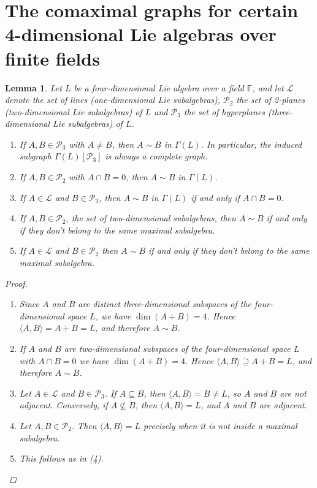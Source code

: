 \documentclass[11pt]{amsart}
\theoremstyle{plain}
\newtheorem{lemma}[theorem]{Lemma}
\begin{document}
\section{The comaximal graphs for certain 4-dimensional Lie algebras over finite fields}

\begin{lemma}\label{g-adjacency}
Let $L$ be a four-dimensional Lie algebra over a field $\mathbb{F}$,  and let $\mathcal{L}$ denote the set of lines (one-dimensional Lie subalgebras), $\mathcal{P_2}$ the set of 2-planes (two-dimensional Lie subalgebras) of $L$ and $\mathcal{P_3}$ the set of hyperplanes (three-dimensional Lie subalgebras) of $L$.
\begin{enumerate}[(1)]
\item If $A, B \in \mathcal{P}_3$ with $A \neq B$, then $A \sim B$ in $\Gamma(L)$. In particular, the induced subgraph 
$\Gamma(L)[\mathcal{P}_3]$ is always a complete graph.
\item If $A, B \in \mathcal{P}_2$ with $A\cap B=0$, then $A \sim B$ in $\Gamma(L)$.
\item If $A \in \mathcal{L}$ and $B \in \mathcal{P}_3$, then $A \sim B$ in $\Gamma(L)$ if and only if $A \cap B=0$.
\item If $A, B\in \mathcal{P}_2$, the set of two-dimensional subalgebras, then $A\sim B$ if and only if they don't belong to the same maximal subalgebra.
\item If $A\in \mathcal{L}$ and $B\in \mathcal{P}_2$ then $A\sim B$ if and only if they don't belong to the same maximal subalgebra.
\end{enumerate}

\begin{proof}
\begin{enumerate}[(1)]
\item Since $A$ and $B$ are distinct three-dimensional subspaces of the four-dimensional space $L$, we have $\dim(A + B) = 4$. Hence $\langle A, B \rangle = A + B = L$, and therefore $A \sim B$.
 \item If $A$ and $B$ are two-dimensional subspaces of the four-dimensional space $L$ with $A\cap B=0$ we have $\dim(A + B) = 4$. Hence $\langle A, B \rangle \supseteq A + B = L$, and therefore $A \sim B$. 
\item Let $A\in\mathcal{L}$ and $B\in\mathcal{P}_3$. If $A\subseteq B$, then $\langle A,B\rangle =B\neq L$, so $A$ and $B$ are not adjacent. Conversely, if $A\not\subseteq B$, then $\langle A,B\rangle = L$, and $A$ and $B$ are adjacent.
\item Let $A,B\in \mathcal{P}_2$. Then $\langle A,B\rangle=L$ precisely when it is not inside a maximal subalgebra.
\item This follows as in (4).
\end{enumerate}
\end{proof}
\end{lemma}
\end{document}
